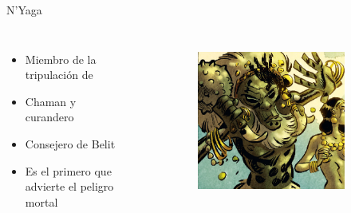 \note[itemize]{
	\item
}

\begin{frame}{N'Yaga}
	\begin{columns}
		\begin{itemize}
			\item Miembro de la tripulación de 
			\item Chaman y curandero
			\item Consejero de Belit
			\item Es el primero que advierte el peligro mortal
		\end{itemize}
		\begin{figure}[htp]
			\centering
			\begin{subfigure}[b]{0.31\textwidth}
				\includegraphics[width=\textwidth]{img/nyaga/Ablaze}
			\end{subfigure}
			~
			\begin{subfigure}[b]{0.25\textwidth}

\end{subfigure}
\end{figure}
\end{columns}
\end{frame}
